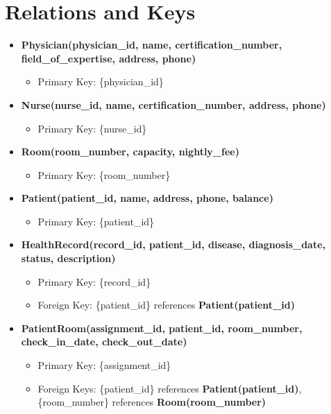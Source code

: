 \documentclass[a4paper,11pt]{article}
\theoremstyle{mytheor}
\begin{document}
\section{Relations and Keys}
\begin{itemize}
    \item \textbf{Physician(physician\_id, name, certification\_number, field\_of\_expertise, address, phone)}
        \begin{itemize}
            \item Primary Key: \{physician\_id\}
        \end{itemize}
    \item \textbf{Nurse(nurse\_id, name, certification\_number, address, phone)}
        \begin{itemize}
            \item Primary Key: \{nurse\_id\}
        \end{itemize}
    \item \textbf{Room(room\_number, capacity, nightly\_fee)}
        \begin{itemize}
            \item Primary Key: \{room\_number\}
        \end{itemize}
    \item \textbf{Patient(patient\_id, name, address, phone, balance)}
        \begin{itemize}
            \item Primary Key: \{patient\_id\}
        \end{itemize}
    \item \textbf{HealthRecord(record\_id, patient\_id, disease, diagnosis\_date, status, description)}
        \begin{itemize}
            \item Primary Key: \{record\_id\}
            \item Foreign Key: \{patient\_id\} references \textbf{Patient(patient\_id)}
        \end{itemize}
    \item \textbf{PatientRoom(assignment\_id, patient\_id, room\_number, check\_in\_date, check\_out\_date)}
        \begin{itemize}
            \item Primary Key: \{assignment\_id\}
            \item Foreign Keys: \{patient\_id\} references \textbf{Patient(patient\_id)}, \{room\_number\} references \textbf{Room(room\_number)}
        \end{itemize}

\end{itemize}
\end{document}
